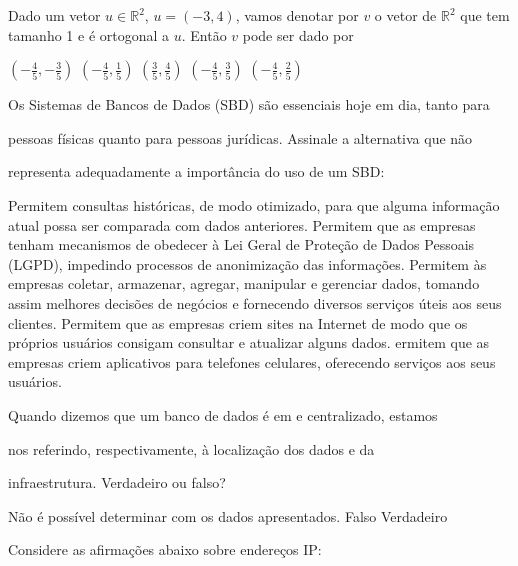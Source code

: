 \documentclass[12pt, addpoints]{exam}
\begin{document}
\begin{questions}
\question

Dado um vetor \( u \in \mathbb{R}^2 \), \( u = (-3, 4) \), vamos denotar por \( v \) o vetor de \( \mathbb{R}^2 \) que tem tamanho 1 e é ortogonal a \( u \). Então \( v \) pode ser dado por


\begin{choices}
\choice \( \left( -\frac{4}{5}, -\frac{3}{5} \right) \)
\choice \( \left( -\frac{4}{5}, \frac{1}{5} \right) \)
\choice \( \left( \frac{3}{5}, \frac{4}{5} \right) \)
\choice \( \left( -\frac{4}{5}, \frac{3}{5} \right) \)
\choice \( \left( -\frac{4}{5}, \frac{2}{5} \right) \)
\end{choices}

\question

Os Sistemas de Bancos de Dados (SBD) são essenciais hoje em dia, tanto para

pessoas físicas quanto para pessoas jurídicas. Assinale a alternativa que não

representa adequadamente a importância do uso de um SBD:
\begin{choices}
\choice Permitem consultas históricas, de modo otimizado, para que alguma informação atual possa ser comparada com dados anteriores.
\choice Permitem que as empresas tenham mecanismos de obedecer à Lei Geral de Proteção de Dados Pessoais (LGPD), impedindo processos de anonimização das informações.
\choice Permitem às empresas coletar, armazenar, agregar, manipular e gerenciar dados, tomando assim melhores decisões de negócios e fornecendo diversos serviços úteis aos seus clientes.
\choice Permitem que as empresas criem sites na Internet de modo que os próprios usuários consigam consultar e atualizar alguns dados.
\choice ermitem que as empresas criem aplicativos para telefones celulares, oferecendo serviços aos seus usuários.
\end{choices}

\question

Quando dizemos que um banco de dados é em  e centralizado, estamos

nos referindo, respectivamente, à localização dos dados e da

infraestrutura. Verdadeiro ou falso?
\begin{choices}
\choice Não é possível determinar com os dados apresentados.
\choice Falso
\choice Verdadeiro
\end{choices}

\question

Considere as afirmações abaixo sobre endereços IP:


\end{questions}
\end{document}

